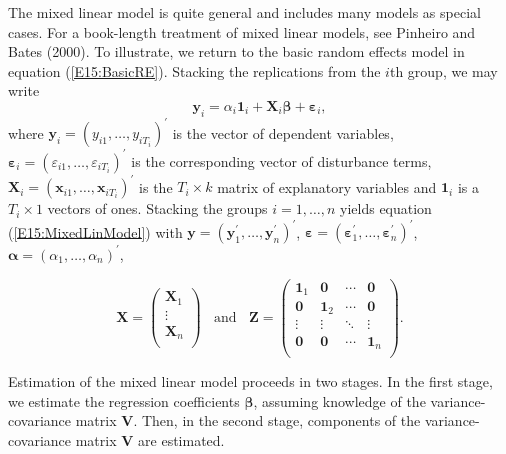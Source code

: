 The mixed linear model is quite general and includes many models as
special cases. For a book-length treatment of mixed linear models,
see Pinheiro and Bates (2000). To illustrate, we return to the basic
random effects model in equation (\ref{E15:BasicRE}). Stacking the
replications from the $i$th group, we may write
\begin{equation*}
\mathbf{y}_i =  \alpha_i \mathbf{1}_i +  \mathbf{X}_i \boldsymbol
\beta +\boldsymbol \varepsilon_i,
\end{equation*}
where $\mathbf{y}_i = (y_{i1} , \ldots, y_{iT_i})^{\prime}$ is the
vector of dependent variables, $\boldsymbol \varepsilon_i = (
\varepsilon_{i1} , \ldots,  \varepsilon_{iT_i})^{\prime}$ is the
corresponding vector of disturbance terms, $\mathbf{X}_i =
(\mathbf{x}_{i1} , \ldots, \mathbf{x}_{iT_i})^{\prime}$ is the $T_i
\times k$ matrix of explanatory variables and $\mathbf{1}_i$ is a
$T_i \times 1$ vectors of ones. Stacking the groups $i=1, \ldots, n$
yields equation (\ref{E15:MixedLinModel}) with $\mathbf{y} =
(\mathbf{y}_1^{\prime} , \ldots, \mathbf{y}_n^{\prime})^{\prime}$,
$\boldsymbol \varepsilon = (\boldsymbol \varepsilon_1 ^{\prime},
\ldots, \boldsymbol \varepsilon_n^{\prime})^{\prime}$, $\boldsymbol
\alpha = ( \alpha _1 , \ldots,  \alpha _n)^{\prime}$,

\begin{equation*}
\mathbf{X}= \left(
  \begin{array}{c}
    \mathbf{X}_1 \\
   \vdots \\
    \mathbf{X}_n \\
  \end{array}
\right) ~~~~\mathrm{and}~~~~ \mathbf{Z}= \left(
  \begin{array}{cccc}
   \mathbf{1}_1 & \mathbf{0} & \cdots & \mathbf{0}\\
    \mathbf{0} & \mathbf{1}_2 & \cdots & \mathbf{0}\\
    \vdots & \vdots & \ddots & \vdots \\
\mathbf{0} &  \mathbf{0}& \cdots & \mathbf{1}_n\\
  \end{array}
\right) .
\end{equation*}

Estimation of the mixed linear model proceeds in two stages. In the
first stage, we estimate the regression coefficients $\boldsymbol
\beta$, assuming knowledge of the variance-covariance matrix
$\mathbf V$. Then, in the second stage, components of the
variance-covariance matrix $\mathbf V$ are estimated.


